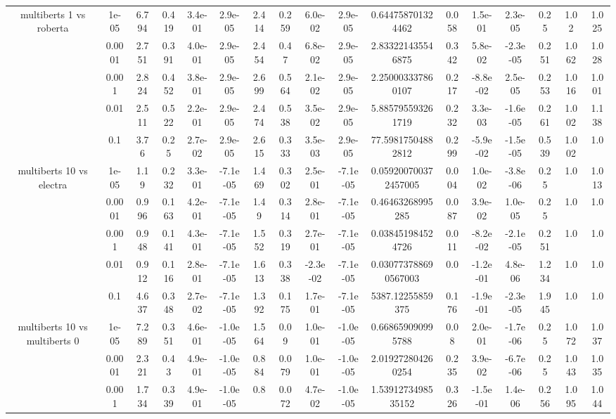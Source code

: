 \begin{tabular}{|c|c|c|c|c|c|c|c|c|c|c|c|c|c|c|c|c|}
\hline
\multirow{5}{*}{multiberts 1 vs roberta } & 1e-05 & 6.794 & 0.419 & 3.4e-01 & 2.9e-05 & 2.414 & 0.259 & 6.0e-02 & 2.9e-05 & 0.644758701324462 & 0.058 & 1.5e-01 & 2.3e-05 & 0.25 & 1.02 & 1.025 \\
 & 0.0001 & 2.751 & 0.391 & 4.0e-01 & 2.9e-05 & 2.454 & 0.47 & 6.8e-02 & 2.9e-05 & 2.833221435546875 & 0.342 & 5.8e-02 & -2.3e-05 & 0.251 & 1.062 & 1.028 \\
 & 0.001 & 2.824 & 0.452 & 3.8e-01 & 2.9e-05 & 2.699 & 0.564 & 2.1e-02 & 2.9e-05 & 2.250003337860107 & 0.217 & -8.8e-02 & 2.5e-05 & 0.253 & 1.016 & 1.001 \\
 & 0.01 & 2.511 & 0.522 & 2.2e-01 & 2.9e-05 & 2.474 & 0.538 & 3.5e-02 & 2.9e-05 & 5.885795593261719 & 0.232 & 3.3e-03 & -1.6e-05 & 0.261 & 1.002 & 1.138 \\
 & 0.1 & 3.76 & 0.25 & 2.7e-02 & 2.9e-05 & 2.615 & 0.333 & 3.5e-03 & 2.9e-05 & 77.59817504882812 & 0.299 & -5.9e-02 & -1.5e-05 & 0.539 & 1.002 & 1.0 \\
\hline
\multirow{5}{*}{multiberts 10 vs electra } & 1e-05 & 1.19 & 0.232 & 3.3e-01 & -7.1e-05 & 1.469 & 0.302 & 2.5e-01 & -7.1e-05 & 0.059200700372457005 & 0.004 & 1.0e-02 & -3.8e-06 & 0.25 & 1.0 & 1.013 \\
 & 0.0001 & 0.996 & 0.163 & 4.2e-01 & -7.1e-05 & 1.49 & 0.314 & 2.8e-01 & -7.1e-05 & 0.46463268995285 & 0.087 & 3.9e-02 & 1.0e-05 & 0.25 & 1.0 & 1.0 \\
 & 0.001 & 0.948 & 0.141 & 4.3e-01 & -7.1e-05 & 1.552 & 0.319 & 2.7e-01 & -7.1e-05 & 0.038451984524726 & 0.011 & -8.2e-02 & -2.1e-05 & 0.251 & 1.0 & 1.0 \\
 & 0.01 & 0.912 & 0.116 & 2.8e-01 & -7.1e-05 & 1.613 & 0.338 & -2.3e-02 & -7.1e-05 & 0.030773788690567003 & 0.0 & -1.2e-01 & 4.8e-06 & 1.234 & 1.0 & 1.0 \\
 & 0.1 & 4.637 & 0.348 & 2.7e-02 & -7.1e-05 & 1.392 & 0.175 & 1.7e-01 & -7.1e-05 & 5387.12255859375 & 0.176 & -1.9e-01 & -2.3e-05 & 1.945 & 1.0 & 1.0 \\
\hline
\multirow{5}{*}{multiberts 10 vs multiberts 0} & 1e-05 & 7.289 & 0.351 & 4.6e-01 & -1.0e-05 & 1.564 & 0.09 & 1.0e-01 & -1.0e-05 & 0.668659090995788 & 0.08 & 2.0e-01 & -1.7e-06 & 0.25 & 1.072 & 1.037 \\
 & 0.0001 & 2.321 & 0.43 & 4.9e-01 & -1.0e-05 & 0.884 & 0.079 & 1.0e-01 & -1.0e-05 & 2.019272804260254 & 0.235 & 3.9e-02 & -6.7e-06 & 0.25 & 1.043 & 1.035 \\
 & 0.001 & 1.734 & 0.339 & 4.9e-01 & -1.0e-05 & 0.8 & 0.072 & 4.7e-02 & -1.0e-05 & 1.5391273498535152 & 0.326 & -1.5e-01 & 1.4e-06 & 0.256 & 1.095 & 1.044 \\

\end{tabular}
